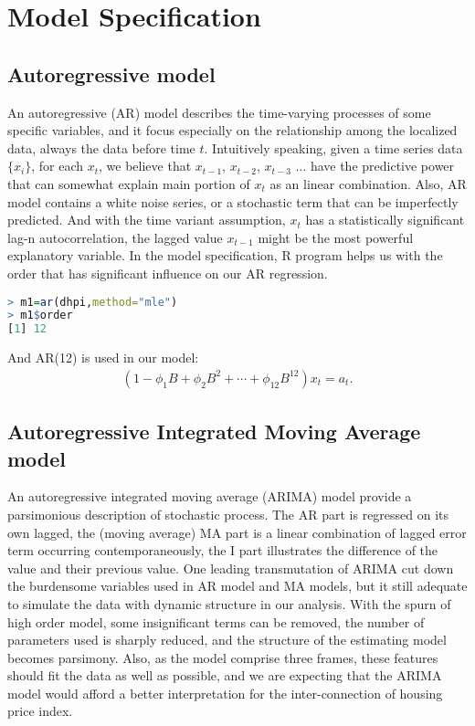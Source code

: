 \documentclass[12pt,letterpaper]{article}
\begin{document}
\section{Model Specification}
\subsection{Autoregressive model}
An autoregressive (AR) model describes the time-varying processes of some specific variables, and it focus especially on the relationship among the localized data, always the data before time $t$. 
Intuitively speaking, given a time series data $ \{x_i\}$, for each $x_t$, we believe that $x_{t-1}$, $x_{t-2}$, $x_{t-3}$ $\dots$ have the predictive power that can somewhat explain main portion of $x_t$ as an linear combination.
Also, AR model contains a white noise series, or a stochastic term that can be imperfectly predicted.
And with the time variant assumption, $x_t$ has a statistically significant lag-n autocorrelation, the lagged value $x_{t-1}$ might be the most powerful explanatory variable.
In the model specification, R program helps us with the order that has significant influence on our AR regression.

{\footnotesize
\begin{lstlisting}[language=R]
> m1=ar(dhpi,method="mle")
> m1$order
[1] 12
\end{lstlisting}
}

And AR(12) is used in our model:
\begin{equation}
\begin{aligned}
(1-\phi_1B+\phi_2B^2+ \cdots + \phi_{12}B^{12})x_t=a_t.
\end{aligned}
\end{equation}

\subsection{Autoregressive Integrated Moving Average model}
An autoregressive integrated moving average (ARIMA) model provide a parsimonious description of stochastic process. 
The AR part is regressed on its own lagged, the (moving average) MA part is a linear combination of lagged error term occurring contemporaneously, the I part illustrates the difference of the value and their previous value. 
One leading transmutation of ARIMA cut down the burdensome variables used in AR model and MA models, but it still adequate to simulate the data with dynamic structure in our analysis.
With the spurn of high order model, some insignificant terms can be removed, the number of parameters used is sharply reduced, and the structure of the estimating model becomes parsimony.
Also, as the model comprise three frames, these features should fit the data as well as possible, and we are expecting that the ARIMA model would afford a better interpretation for the inter-connection of housing price index.
\end{document}
